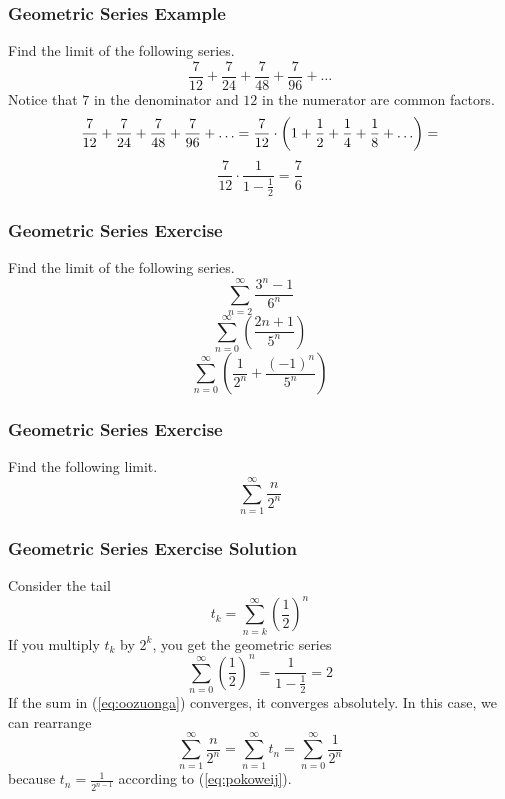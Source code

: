 \documentclass[xcolor=dvipsnames]{beamer}
\begin{document}
\begin{frame}
  \frametitle{Geometric Series Example}
 Find the limit of the following
series.
\begin{equation}
  \label{eq:aedairoy}
  \frac{7}{12}+\frac{7}{24}+\frac{7}{48}+\frac{7}{96}+{\ldots}
\end{equation}
Notice that $7$ in the denominator and $12$ in the numerator are
common factors.
\begin{equation}
  \label{eq:eechuwee}
  \frac{7}{12}+\frac{7}{24}+\frac{7}{48}+\frac{7}{96}+{\ldots}=\frac{7}{12}\cdot\left(1+\frac{1}{2}+\frac{1}{4}+\frac{1}{8}+{\ldots}\right)=\notag
\end{equation}
\begin{equation}
  \label{eq:pomahwus}
  \frac{7}{12}\cdot\frac{1}{1-\frac{1}{2}}=\frac{7}{6}
\end{equation}
\end{frame}

\begin{frame}
  \frametitle{Geometric Series Exercise}
  {\ubung} Find the limit of the
  following series.
\begin{equation}
  \label{eq:tahsaepi}
  \sum_{n=2}^{\infty}\frac{3^{n}-1}{6^{n}}
\end{equation}
\begin{equation}
  \label{eq:xahhusaj}
  \sum_{n=0}^{\infty}\left(\frac{2{n+1}}{5^{n}}\right)
\end{equation}
\begin{equation}
  \label{eq:vaetoegh}
  \sum_{n=0}^{\infty}\left(\frac{1}{2^{n}}+\frac{(-1)^{n}}{5^{n}}\right)
\end{equation}
\end{frame}

\begin{frame}
  \frametitle{Geometric Series Exercise}
  {\ubung} Find the following limit.
  \begin{equation}
    \label{eq:oozuonga}
    \sum_{n=1}^{\infty}\frac{n}{2^{n}}
  \end{equation}
\end{frame}

\begin{frame}
  \frametitle{Geometric Series Exercise Solution}
  Consider the tail
  \begin{equation}
    \label{eq:ohaceisi}
    t_{k}=\sum_{n=k}^{\infty}\left(\frac{1}{2}\right)^{n}
  \end{equation}
  If you multiply $t_{k}$ by $2^{k}$, you get the geometric series
  \begin{equation}
    \label{eq:pokoweij}
    \sum_{n=0}^{\infty}\left(\frac{1}{2}\right)^{n}=\frac{1}{1-\frac{1}{2}}=2
  \end{equation}
If the sum in (\ref{eq:oozuonga}) converges, it converges absolutely.
In this case, we can rearrange
\begin{equation}
  \label{eq:tichohyo}
  \sum_{n=1}^{\infty}\frac{n}{2^{n}}=\sum_{n=1}^{\infty}t_{n}=\sum_{n=0}^{\infty}\frac{1}{2^{n}}
\end{equation}
because $t_{n}=\frac{1}{2^{n-1}}$ according to (\ref{eq:pokoweij}).
\end{frame}
\end{document}
